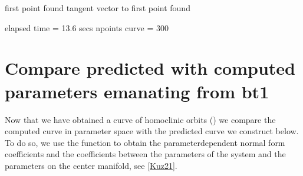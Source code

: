 \documentclass[letterpaper,10pt,english]{jupyterBook}
\begin{document}
\begin{sphinxVerbatim}[commandchars=\\\{\}]
\end{sphinxVerbatim}

\begin{sphinxVerbatim}[commandchars=\\\{\}]
first point found
tangent vector to first point found

elapsed time  = 13.6 secs
npoints curve = 300
\end{sphinxVerbatim}


\section{Compare predicted with computed parameters emanating from bt1}
\label{\detokenize{CO-oxidation:compare-predicted-with-computed-parameters-emanating-from-bt1}}
\sphinxAtStartPar
Now that we have obtained a curve of homoclinic orbits () we
compare the computed curve in parameter space with the predicted curve we
construct below. To do so, we use the function  to obtain the
parameter\sphinxhyphen{}dependent normal form coefficients and the coefficients between the
parameters of the system and the parameters on the center manifold, see
{[}\hyperlink{cite.references:id3}{Kuz21}{]}.
\end{document}
